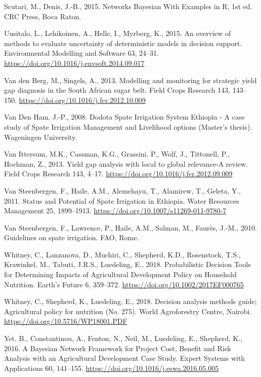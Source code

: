 \documentclass[]{elsarticle} %
\begin{document}
\leavevmode\hypertarget{ref-Scutari_and_Denis_2015}{}%
Scutari, M., Denis, J.-B., 2015. Networks Bayesian With Examples in R, 1st ed. CRC Press, Boca Raton.

\leavevmode\hypertarget{ref-Uusitalo_et_al_2015}{}%
Uusitalo, L., Lehikoinen, A., Helle, I., Myrberg, K., 2015. An overview of methods to evaluate uncertainty of deterministic models in decision support. Environmental Modelling and Software 63, 24--31. \url{https://doi.org/10.1016/j.envsoft.2014.09.017}

\leavevmode\hypertarget{ref-VandenBerg_and_Singels_2013}{}%
Van den Berg, M., Singels, A., 2013. Modelling and monitoring for strategic yield gap diagnosis in the South African sugar belt. Field Crops Research 143, 143--150. \url{https://doi.org/10.1016/j.fcr.2012.10.009}

\leavevmode\hypertarget{ref-Van_den_Ham_2008}{}%
Van Den Ham, J.-P., 2008. Dodota Spate Irrigation System Ethiopia - A case study of Spate Irrigation Management and Livelihood options (Master's thesis). Wageningen University.

\leavevmode\hypertarget{ref-VanIttersum_et_al_2013}{}%
Van Ittersum, M.K., Cassman, K.G., Grassini, P., Wolf, J., Tittonell, P., Hochman, Z., 2013. Yield gap analysis with local to global relevance-A review. Field Crops Research 143, 4--17. \url{https://doi.org/10.1016/j.fcr.2012.09.009}

\leavevmode\hypertarget{ref-VanSteenbergen_et_al_2011a}{}%
Van Steenbergen, F., Haile, A.M., Alemehayu, T., Alamirew, T., Geleta, Y., 2011. Status and Potential of Spate Irrigation in Ethiopia. Water Resources Management 25, 1899--1913. \url{https://doi.org/10.1007/s11269-011-9780-7}

\leavevmode\hypertarget{ref-VanSteenbergen_et_al_2010}{}%
Van Steenbergen, F., Lawrence, P., Haile, A.M., Salman, M., Faurès, J.-M., 2010. Guidelines on spate irrigation. FAO, Rome.

\leavevmode\hypertarget{ref-Whitney_Lanzanova_et_al_2018}{}%
Whitney, C., Lanzanova, D., Muchiri, C., Shepherd, K.D., Rosenstock, T.S., Krawinkel, M., Tabuti, J.R.S., Luedeling, E., 2018. Probabilistic Decision Tools for Determining Impacts of Agricultural Development Policy on Household Nutrition. Earth's Future 6, 359--372. \url{https://doi.org/10.1002/2017EF000765}

\leavevmode\hypertarget{ref-Whitney_Shepherd_et_al_2018}{}%
Whitney, C., Shepherd, K., Luedeling, E., 2018. Decision analysis methods guide; Agricultural policy for nutrition (No. 275). World Agroforestry Centre, Nairobi. \url{https://doi.org/10.5716/WP18001.PDF}

\leavevmode\hypertarget{ref-Yet_et_al_2016}{}%
Yet, B., Constantinou, A., Fenton, N., Neil, M., Luedeling, E., Shepherd, K., 2016. A Bayesian Network Framework for Project Cost, Benefit and Risk Analysis with an Agricultural Development Case Study. Expert Systems with Applications 60, 141--155. \url{https://doi.org/10.1016/j.eswa.2016.05.005}
\end{document}
